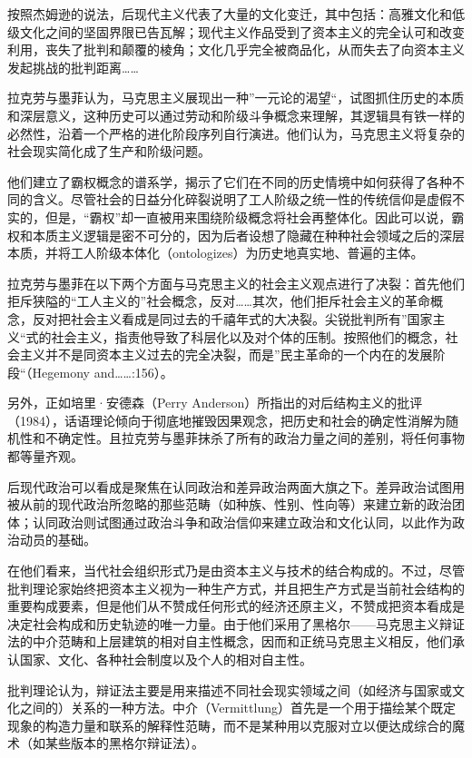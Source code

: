 按照杰姆逊的说法，后现代主义代表了大量的文化变迁，其中包括：高雅文化和低级文化之间的坚固界限已告瓦解；现代主义作品受到了资本主义的完全认可和改变利用，丧失了批判和颠覆的棱角；文化几乎完全被商品化，从而失去了向资本主义发起挑战的批判距离……

拉克劳与墨菲认为，马克思主义展现出一种”一元论的渴望“，试图抓住历史的本质和深层意义，这种历史可以通过劳动和阶级斗争概念来理解，其逻辑具有铁一样的必然性，沿着一个严格的进化阶段序列自行演进。他们认为，马克思主义将复杂的社会现实简化成了生产和阶级问题。

他们建立了霸权概念的谱系学，揭示了它们在不同的历史情境中如何获得了各种不同的含义。尽管社会的日益分化碎裂说明了工人阶级之统一性的传统信仰是虚假不实的，但是，“霸权”却一直被用来围绕阶级概念将社会再整体化。因此可以说，霸权和本质主义逻辑是密不可分的，因为后者设想了隐藏在种种社会领域之后的深层本质，并将工人阶级本体化（ontologizes）为历史地真实地、普遍的主体。

拉克劳与墨菲在以下两个方面与马克思主义的社会主义观点进行了决裂：首先他们拒斥狭隘的“工人主义的”社会概念，反对……其次，他们拒斥社会主义的革命概念，反对把社会主义看成是同过去的千禧年式的大决裂。尖锐批判所有”国家主义“式的社会主义，指责他导致了科层化以及对个体的压制。按照他们的概念，社会主义并不是同资本主义过去的完全决裂，而是”民主革命的一个内在的发展阶段“（Hegemony and……:156）。

另外，正如培里·安德森（Perry Anderson）所指出的对后结构主义的批评（1984），话语理论倾向于彻底地摧毁因果观念，把历史和社会的确定性消解为随机性和不确定性。且拉克劳与墨菲抹杀了所有的政治力量之间的差别，将任何事物都等量齐观。

后现代政治可以看成是聚焦在认同政治和差异政治两面大旗之下。差异政治试图用被从前的现代政治所忽略的那些范畴（如种族、性别、性向等）来建立新的政治团体；认同政治则试图通过政治斗争和政治信仰来建立政治和文化认同，以此作为政治动员的基础。


在他们看来，当代社会组织形式乃是由资本主义与技术的结合构成的。不过，尽管批判理论家始终把资本主义视为一种生产方式，并且把生产方式是当前社会结构的重要构成要素，但是他们从不赞成任何形式的经济还原主义，不赞成把资本看成是决定社会构成和历史轨迹的唯一力量。由于他们采用了黑格尔——马克思主义辩证法的中介范畴和上层建筑的相对自主性概念，因而和正统马克思主义相反，他们承认国家、文化、各种社会制度以及个人的相对自主性。

批判理论认为，辩证法主要是用来描述不同社会现实领域之间（如经济与国家或文化之间的）关系的一种方法。中介（Vermittlung）首先是一个用于描绘某个既定现象的构造力量和联系的解释性范畴，而不是某种用以克服对立以便达成综合的魔术（如某些版本的黑格尔辩证法）。

